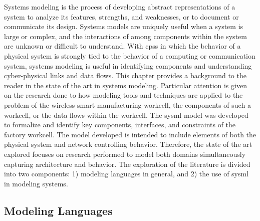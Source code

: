 Systems modeling is the process of developing abstract representations of a system to analyze its features, strengths, and weaknesses, or to document or communicate its design.  Systems models are uniquely useful when a system is large or complex, and the interactions of among components within the system are unknown or difficult to understand.  With \glspl{cps} in which the behavior of a physical system is strongly tied to the behavior of a computing or communication system, systems modeling is useful in identifying components and understanding cyber-physical links and data flows.   This chapter provides a background to the reader in the state of the art in systems modeling.  Particular attention is given on the research done to how modeling tools and techniques are applied to the problem of the wireless smart manufacturing workcell, the components of such a workcell, or the data flows within the workcell.  The \gls{sysml} model was developed to formalize and identify key components, interfaces, and constraints of the factory workcell.  The model developed is intended to include elements of both the physical system and network controlling behavior.  Therefore, the state of the art explored focuses on research performed to model both domains simultaneously capturing architecture and behavior.  The exploration of the literature is divided into two components: 1) modeling languages in general, and 2) the use of \gls{sysml} in modeling systems.

\subsection{Modeling Languages} \label{sysml:sec:languages}

